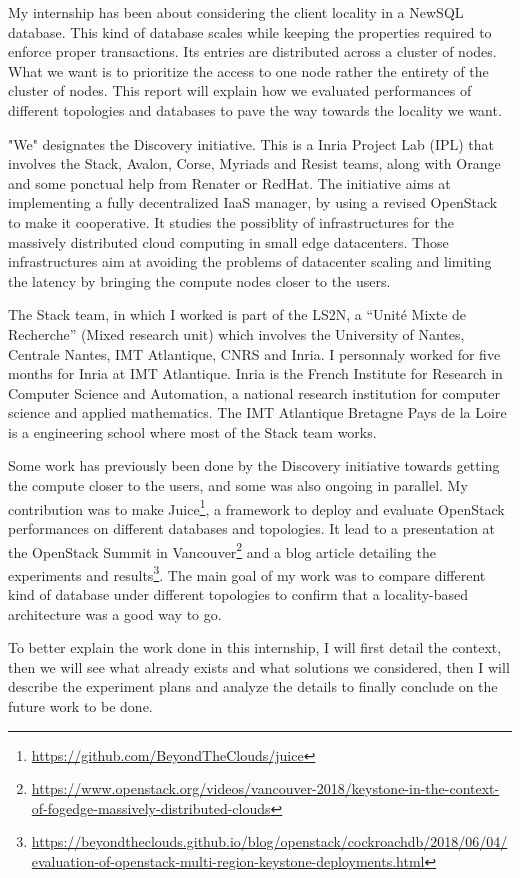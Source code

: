 My internship has been about considering the client locality in a NewSQL database. This kind of database scales while keeping the properties required to enforce proper transactions. Its entries are distributed across a cluster of nodes. What we want is to prioritize the access to one node rather the entirety of the cluster of nodes. This report will explain how we evaluated performances of different topologies and databases to pave the way towards the locality we want.

"We" designates the Discovery initiative\cite{discovery}. This is a Inria Project Lab (IPL) that involves the Stack, Avalon, Corse, Myriads and Resist teams, along with Orange and some ponctual help from Renater or RedHat. The initiative aims at implementing a fully decentralized IaaS manager, by using a revised OpenStack to make it cooperative. It studies the possiblity of infrastructures for the massively distributed cloud computing in small edge datacenters. Those infrastructures aim at avoiding the problems of datacenter scaling and limiting the latency by bringing the compute nodes closer to the users.


The Stack team, in which I worked is part of the LS2N, a ``Unité Mixte de Recherche'' (Mixed research unit) which involves the University of Nantes, Centrale Nantes, IMT Atlantique, CNRS and Inria. I personnaly worked for five months for Inria at IMT Atlantique. Inria is the French Institute for Research in Computer Science and Automation, a national research institution for computer science and applied mathematics. The IMT Atlantique Bretagne Pays de la Loire is a engineering school where most of the Stack team works.

Some work has previously been done by the Discovery initiative towards getting the compute closer to the users, and some was also ongoing in parallel. My contribution was to make Juice\footnote{\url{https://github.com/BeyondTheClouds/juice}}, a framework to deploy and evaluate OpenStack performances on different databases and topologies. It lead to a presentation at the OpenStack Summit in Vancouver\footnote{\url{https://www.openstack.org/videos/vancouver-2018/keystone-in-the-context-of-fogedge-massively-distributed-clouds}} and a blog article detailing the experiments and results\footnote{\url{https://beyondtheclouds.github.io/blog/openstack/cockroachdb/2018/06/04/evaluation-of-openstack-multi-region-keystone-deployments.html}}. The main goal of my work was to compare different kind of database under different topologies to confirm that a locality-based architecture was a good way to go.

To better explain the work done in this internship, I will first detail the context, then we will see what already exists and what solutions we considered, then I will describe the experiment plans and analyze the details to finally conclude on the future work to be done.
\fi
